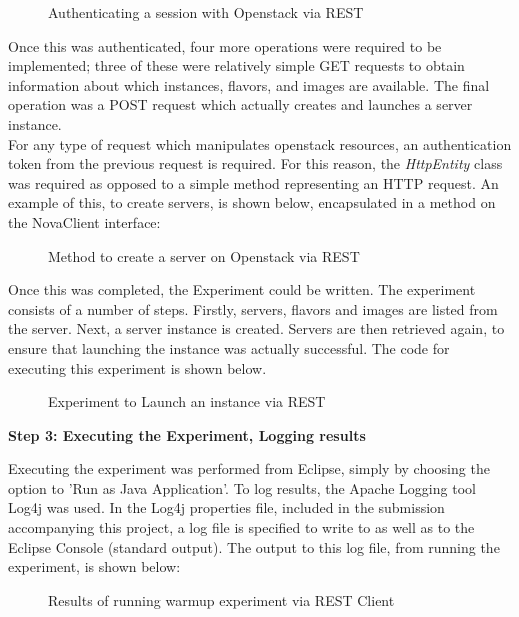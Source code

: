 \begin{figure}[H]
\centering
{}
\caption{Authenticating a session with Openstack via REST} 
\end{figure}

Once this was authenticated, four more operations were required to be implemented; three of these were relatively simple GET requests to obtain information about which instances, flavors, and images are available. The final operation was a POST request which actually creates and launches a server instance. \\
For any type of request which manipulates openstack resources, an authentication token from the previous request is required. For this reason, the \textit{HttpEntity} class was required as opposed to a simple method representing an HTTP request. An example of this, to create servers, is shown below, encapsulated in a method on the NovaClient interface:

\begin{figure}[H]
\centering
{}
\caption{Method to create a server on Openstack via REST} 
\end{figure}

Once this was completed, the Experiment could be written. The experiment consists of a number of steps. Firstly, servers, flavors and images are listed from the server. Next, a server instance is created. Servers are then retrieved again, to ensure that launching the instance was actually successful. The code for executing this experiment is shown below. 

\begin{figure}[H]
\centering
{}
\caption{Experiment to Launch an instance via REST} 
\end{figure}

\textbf{Step 3: Executing the Experiment, Logging results}

Executing the experiment was performed from Eclipse, simply by choosing the option to 'Run as Java Application'. To log results, the Apache Logging tool Log4j was used\cite{log4j}. In the Log4j properties file, included in the submission accompanying this project, a log file is specified to write to as well as to the Eclipse Console (standard output). The output to this log file, from running the experiment, is shown below:

\begin{figure}[H]
\centering
{}
\caption{Results of running warmup experiment via REST Client} 
\end{figure}
  
